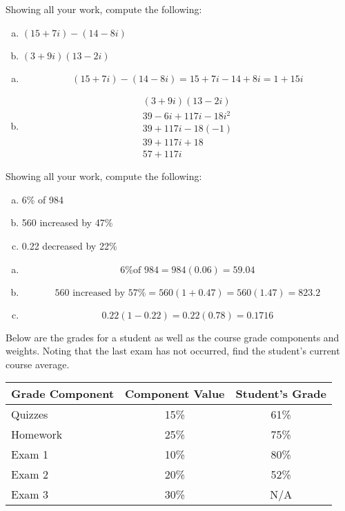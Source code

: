 \documentclass[12pt,letterpaper]{exam}
\begin{document}
\begin{questions}
\newpage
\question[10] Showing all your work, compute the following:
	\begin{enumerate}[(a)]
	\item $(15 + 7i) - (14 - 8i)$
	\item  $(3 + 9i)(13 - 2i)$
	\end{enumerate} \pspace

\sol 
\begin{enumerate}[(a)]
\item 
	\[
	(15 + 7i) - (14 - 8i)= 15 + 7i - 14 + 8i= 1 + 15i
	\] \pspace

\item 
	\[
	\begin{gathered}
	(3 + 9i)(13 - 2i) \\[0.3cm]
	39 - 6i + 117i - 18i^2 \\[0.3cm]
	39 + 117i - 18(-1) \\[0.3cm]
	39 + 117i + 18 \\[0.3cm]
	57 + 117i
	\end{gathered}
	\]
\end{enumerate}



\newpage
\question[10] Showing all your work, compute the following:
	\begin{enumerate}[(a)]
	\item 6\% of 984
	\item 560 increased by 47\%
	\item 0.22 decreased by 22\%
	\end{enumerate} \pspace

\sol 
\begin{enumerate}[(a)]
\item 
	\[
	\text{6\% of 984}= 984(0.06)= 59.04
	\] \pspace

\item 
	\[
	\text{560 increased by 57\%}= 560(1 + 0.47)= 560(1.47)= 823.2
	\] \pspace

\item 
	\[
	0.22(1 - 0.22)= 0.22(0.78)= 0.1716
	\]
\end{enumerate}



\newpage
\question[10] Below are the grades for a student as well as the course grade components and weights. Noting that the last exam has not occurred, find the student's current course average. \par
	\begin{table}[ht]
	\centering
	\begin{tabular}{lcc}
	Grade Component & Component Value & Student's Grade \\ \hline
	Quizzes & 15\% & 61\% \\
	Homework & 25\% & 75\% \\
	Exam 1 & 10\% & 80\% \\
	Exam 2 & 20\% & 52\% \\
	Exam 3 & 30\% & N/A \\
	\end{tabular}
	\end{table} \pspace


\end{questions}
\end{document}
